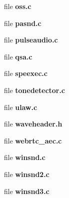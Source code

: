 \begin{DoxyCompactItemize}
file {\bfseries oss.\-c}
\item 
file {\bfseries pasnd.\-c}
\item 
file {\bfseries pulseaudio.\-c}
\item 
file {\bfseries qsa.\-c}
\item 
file {\bfseries speexec.\-c}
\item 
file {\bfseries tonedetector.\-c}
\item 
file {\bfseries ulaw.\-c}
\item 
file {\bfseries waveheader.\-h}
\item 
file {\bfseries webrtc\-\_\-aec.\-c}
\item 
file {\bfseries winsnd.\-c}
\item 
file {\bfseries winsnd2.\-c}
\item 
file {\bfseries winsnd3.\-c}
\end{DoxyCompactItemize}
